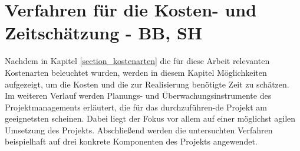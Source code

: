 
\section{Verfahren für die Kosten- und Zeitschätzung - BB, SH}

\label{section_verfahren_schaetzung}
Nachdem in Kapitel \ref{section_kostenarten} die für diese Arbeit relevanten Kostenarten 
beleuchtet wurden, werden in diesem Kapitel Möglichkeiten aufgezeigt, um die Kosten 
und die zur Realisierung benötigte Zeit zu schätzen. Im weiteren Verlauf werden 
Planungs- und Überwachungsinstrumente des Projektmanagements erläutert, die für 
das durchzuführen-de Projekt am geeignetsten scheinen. Dabei liegt der Fokus vor 
allem auf einer möglichst agilen Umsetzung des Projekts. Abschließend werden 
die untersuchten Verfahren beispielhaft auf drei konkrete Komponenten des Projekts 
angewendet.





